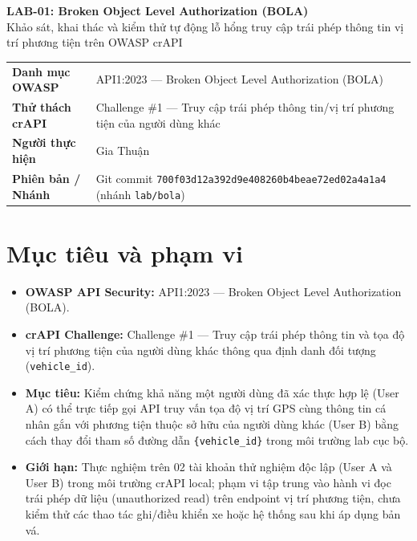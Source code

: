 \documentclass[11pt, a4paper]{article}
\begin{document}
\begin{center}
    {\LARGE\bfseries\color{accent} LAB-01: Broken Object Level Authorization (BOLA)}\\[0.35em]
    {\large Khảo sát, khai thác và kiểm thử tự động lỗ hổng truy cập trái phép thông tin vị trí phương tiện trên OWASP crAPI}
\end{center}

\vspace{0.4em}

\noindent
\begin{tabularx}{\textwidth}{@{} l X @{}}
\toprule
\textbf{Danh mục OWASP} & API1:2023 --- Broken Object Level Authorization (BOLA) \\
\textbf{Thử thách crAPI} & Challenge \#1 --- Truy cập trái phép thông tin/vị trí phương tiện của người dùng khác \\
\textbf{Người thực hiện} & Gia Thuận \\
\textbf{Phiên bản / Nhánh} & Git commit \texttt{700f03d12a392d9e408260b4beae72ed02a4a1a4} (nhánh \texttt{lab/bola}) \\
\bottomrule
\end{tabularx}

\vspace{0.6em}

\section{Mục tiêu và phạm vi}

\begin{itemize}
    \item \textbf{OWASP API Security:} API1:2023 --- Broken Object Level Authorization (BOLA).
    \item \textbf{crAPI Challenge:} Challenge \#1 --- Truy cập trái phép thông tin và tọa độ vị trí phương tiện của người dùng khác thông qua định danh đối tượng (\texttt{vehicle\_id}).
    \item \textbf{Mục tiêu:} Kiểm chứng khả năng một người dùng đã xác thực hợp lệ (User A) có thể trực tiếp gọi API truy vấn tọa độ vị trí GPS cùng thông tin cá nhân gắn với phương tiện thuộc sở hữu của người dùng khác (User B) bằng cách thay đổi tham số đường dẫn \texttt{\{vehicle\_id\}} trong môi trường lab cục bộ.
    \item \textbf{Giới hạn:} Thực nghiệm trên 02 tài khoản thử nghiệm độc lập (User A và User B) trong môi trường crAPI local; phạm vi tập trung vào hành vi đọc trái phép dữ liệu (unauthorized read) trên endpoint vị trí phương tiện, chưa kiểm thử các thao tác ghi/điều khiển xe hoặc hệ thống sau khi áp dụng bản vá.
\end{itemize}
\end{document}
